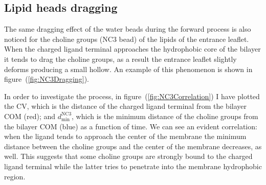 \subsection{Lipid heads dragging}
The same dragging effect of the water beads during the forward process is also noticed for the choline groups (NC$3$ \martini bead) of the lipids of the entrance leaflet. When the charged ligand terminal approaches the hydrophobic core of the bilayer it tends to drag the choline groups, as a result the entrance leaflet slightly deforms producing a small hollow. An example of this phenomenon is shown in figure~(\ref{fig:NC3Dragging}). 

In order to investigate the process, in figure~(\ref{fig:NC3Correlation}) I have plotted the \ac{CV}, which is the distance of the charged ligand terminal from the bilayer \ac{COM} (red); and $d_\text{min}^{\text{NC}3}$, which is the minimum distance of the choline groups from the bilayer \ac{COM} (blue) as a function of time. We can see an evident correlation: when the ligand tends to approach the center of the membrane the minimum distance between the choline groups and the center of the membrane decreases, as well. This suggests that some choline groups are strongly bound to the charged ligand terminal while the latter tries to penetrate into the membrane hydrophobic region. 
